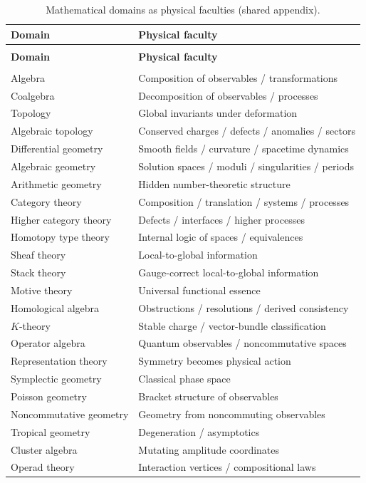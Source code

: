 \documentclass[12pt]{article}
\theoremstyle{definition}
\theoremstyle{remark}
\begin{document}
\begin{longtable}{@{}>{\raggedright\arraybackslash}p{4.6cm}>{\raggedright\arraybackslash}p{8.0cm}@{}}
\caption{Mathematical domains as physical faculties (shared appendix).}
\label{tab:faculties}\\
\toprule
\textbf{Domain} & \textbf{Physical faculty} \\
\midrule
\endfirsthead
\multicolumn{2}{@{}l}{\small\itshape \Cref{tab:faculties}, continued}\\
\toprule
\textbf{Domain} & \textbf{Physical faculty} \\
\midrule
\endhead
\midrule
\multicolumn{2}{r@{}}{\small\itshape continued on next page}\\
\endfoot
\bottomrule
\endlastfoot
Algebra & Composition of observables / transformations \\
Coalgebra & Decomposition of observables / processes \\
Topology & Global invariants under deformation \\
Algebraic topology & Conserved charges / defects / anomalies / sectors \\
Differential geometry & Smooth fields / curvature / spacetime dynamics \\
Algebraic geometry & Solution spaces / moduli / singularities / periods \\
Arithmetic geometry & Hidden number-theoretic structure \\
Category theory & Composition / translation / systems / processes \\
Higher category theory & Defects / interfaces / higher processes \\
Homotopy type theory & Internal logic of spaces / equivalences \\
Sheaf theory & Local-to-global information \\
Stack theory & Gauge-correct local-to-global information \\
Motive theory & Universal functional essence \\
Homological algebra & Obstructions / resolutions / derived consistency \\
$K$-theory & Stable charge / vector-bundle classification \\
Operator algebra & Quantum observables / noncommutative spaces \\
Representation theory & Symmetry becomes physical action \\
Symplectic geometry & Classical phase space \\
Poisson geometry & Bracket structure of observables \\
Noncommutative geometry & Geometry from noncommuting observables \\
Tropical geometry & Degeneration / asymptotics \\
Cluster algebra & Mutating amplitude coordinates \\
Operad theory & Interaction vertices / compositional laws \\
\end{longtable}
\end{document}
